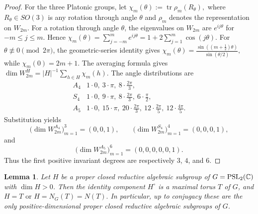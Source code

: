 \documentclass[10pt,a4paper]{amsart}
\numberwithin{equation}{section} \newtheorem{thm}{Theorem}[section] \newtheorem{lem}[thm]{Lemma} \newtheorem{ex}[thm]{Example} \newtheorem{prop}[thm]{Proposition} \newtheorem{cor}[thm]{Corollary} \newtheorem{defi}[thm]{Definition} \newtheorem{rmk}[thm]{Remark} \newtheorem{notation}[thm]{Notation}
\newcommand{\PSLtwo}{\operatorname{PSL}_2(\C)}
\begin{document}
\begin{proof}
For the three Platonic groups, let $\chi_m(\theta):=\operatorname{tr}\rho_m(R_\theta),$ where $R_\theta\in SO(3)$ is any rotation through angle $\theta$ and $\rho_m$ denotes the representation on $W_{2m}$. For a rotation through angle \(\theta\), the eigenvalues on \(W_{2m}\) are \(e^{ij\theta}\) for \(-m\le j\le m\). Hence \(\chi_m(\theta)=\sum_{j=-m}^{m}e^{ij\theta}=1+2\sum_{j=1}^{m}\cos(j\theta).\) For \(\theta\not\equiv0\pmod{2\pi}\), the geometric-series identity gives \(\chi_m(\theta)=\frac{\sin((m+\tfrac12)\theta)}{\sin(\theta/2)},\) while \(\chi_m(0)=2m+1\). The averaging formula gives \(\dim W_{2m}^H=|H|^{-1}\sum_{h\in H}\chi_m(h)\). The angle distributions are
\[
\begin{array}{c|l}
A_4&1\cdot0,\ 3\cdot\pi,\ 8\cdot\frac{2\pi}{3},\\
S_4&1\cdot0,\ 9\cdot\pi,\ 8\cdot\frac{2\pi}{3},\ 6\cdot\frac{\pi}{2},\\
A_5&1\cdot0,\ 15\cdot\pi,\ 20\cdot\frac{2\pi}{3},\ 12\cdot\frac{2\pi}{5},\ 12\cdot\frac{4\pi}{5}.
\end{array}
\]
Substitution yields
\[
\bigl(\dim W_{2m}^{A_4}\bigr)_{m=1}^{3}=(0,0,1),\qquad \bigl(\dim W_{2m}^{S_4}\bigr)_{m=1}^{4}=(0,0,0,1),
\]
and
\[
\bigl(\dim W_{2m}^{A_5}\bigr)_{m=1}^{6}=(0,0,0,0,0,1).
\] Thus the first positive invariant degrees are respectively $3$, $4$, and $6$.
\end{proof}

\begin{lem}\label{lem:reductive-subgroups}
Let $H$ be a proper closed reductive algebraic subgroup of $G=\PSLtwo$ with $\dim H>0$. Then the identity component $H^\circ$ is a maximal torus $T$ of $G$, and \(H=T\text{ or }H=N_G(T)=N(T).\) In particular, up to conjugacy these are the only positive-dimensional proper closed reductive algebraic subgroups of $G$.
\end{lem}
\end{document}
